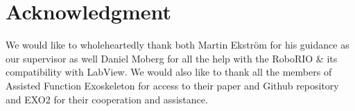 \section*{Acknowledgment}

We would like to wholeheartedly thank both Martin Ekström for his guidance as our supervisor as well Daniel Moberg for all the help with
the RoboRIO \& its compatibility with LabView. We would also like to thank all the members of Assisted Function Exoskeleton for access to their paper and Github repository and EXO2 for their cooperation and
assistance.